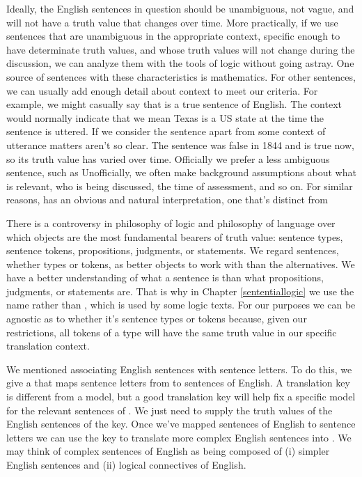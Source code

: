 Ideally, the English sentences in question should be unambiguous, not vague, and will not have a truth value that changes over time. 
More practically, if we use sentences that are unambiguous in the appropriate context, specific enough to have determinate truth values, and whose truth values will not change during the discussion, we can analyze them with the tools of logic without going astray.
One source of sentences with these characteristics is mathematics.  For other sentences, we can usually add enough detail about context to meet our criteria.  For example, we might casually say that  is a true sentence of English.  The context would normally indicate that we mean Texas is a US state at the time the sentence is uttered.  If we consider the sentence apart from some context of utterance matters aren't so clear.  The sentence was false in 1844 and is true now, so its truth value has varied over time. Officially we prefer a less ambiguous sentence, such as   Unofficially, we often make background assumptions about what is relevant, who is being discussed, the time of assessment, and so on.  For similar reasons,  has an obvious and natural interpretation, one that's distinct from 

There is a controversy in philosophy of logic and philosophy of language over which objects are the most fundamental bearers of truth value: sentence types, sentence tokens, propositions, judgments, or statements.  We regard sentences, whether types or tokens, as better objects to work with than the alternatives.  We have a better understanding of what a sentence is than what propositions, judgments, or statements are.  That is why in Chapter \ref{sententiallogic} we use the name  rather than , which is used by some logic texts.  For our purposes we can be agnostic as to whether it's sentence types or tokens because, given our restrictions, all tokens of a type will have the same truth value in our specific translation context. 

We mentioned associating English sentences with \GSL{} sentence letters.  To do this, we give a  that maps sentence letters from \GSL{} to sentences of English.  A translation key is different from a model, but a good translation key will help fix a specific model for the relevant sentences of \GSL{}.  We just need to supply the truth values of the English sentences of the key.  Once we've mapped sentences of English to sentence letters we can use the key to translate more complex English sentences into \GSL{}.  We may think of complex sentences of English as being composed of (i) simpler English sentences and (ii) logical connectives of English.

